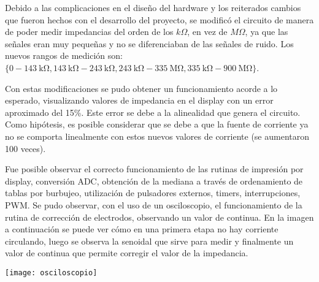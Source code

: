 Debido a las complicaciones en el diseño del hardware y los reiterados cambios que fueron hechos con el desarrollo del proyecto, se modificó el circuito de manera de poder medir impedancias del orden de los $k\Omega$, en vez de $M\Omega$, ya que las señales eran muy pequeñas y no se diferenciaban de las señales de ruido. Los nuevos rangos de medición son: $\{0-\SI{143}{\kilo\ohm}, \SI{143}{\kilo\ohm}-\SI{243}{\kilo\ohm}, \SI{243}{\kilo\ohm}-\SI{335}{\mega\ohm}, \SI{335}{\kilo\ohm}-\SI{900}{\mega\ohm}\}$.

Con estas modificaciones se pudo obtener un funcionamiento acorde a lo esperado, visualizando valores de impedancia en el display con un error aproximado del 15\%. Este error se debe a la alinealidad que genera el circuito. Como hipótesis, es posible considerar que se debe a que la fuente de corriente ya no se comporta linealmente con estos nuevos valores de corriente (se aumentaron 100 veces).

Fue posible observar el correcto funcionamiento de las rutinas de impresión por display, conversión ADC, obtención de la mediana a través de ordenamiento de tablas por burbujeo, utilización de pulsadores externos, timers, interrupciones, PWM. Se pudo observar, con el uso de un osciloscopio, el funcionamiento de la rutina de corrección de electrodos, observando un valor de continua. En la imagen a continuación se puede ver cómo en una primera etapa no hay corriente circulando, luego se observa la senoidal que sirve para medir y finalmente un valor de continua que permite corregir el valor de la impedancia.

\hspace{-1cm}
\texttt{[image: osciloscopio]}

